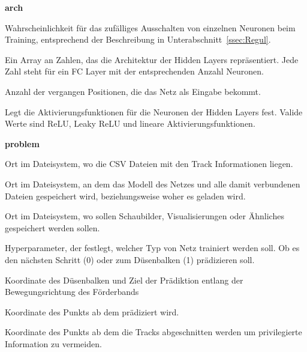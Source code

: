 
\newpage
{\Large \sffamily \textbf{arch}}
\begin{description}[leftmargin=!,labelwidth=\widthof{\bfseries separatorPosition}, labelindent=0.5cm]
    \item [dropoutRate] Wahrscheinlichkeit für das zufälliges Ausschalten von einzelnen Neuronen beim Training, entsprechend der Beschreibung in Unterabschnitt~\ref{ssec:Regul}.
    \item [hiddenLayers] Ein Array an Zahlen, das die Architektur der Hidden Layers repräsentiert. Jede Zahl steht für ein FC Layer mit der entsprechenden Anzahl Neuronen.
    \item [featureSize] Anzahl der vergangen Positionen, die das Netz als Eingabe bekommt.
    \item [activation] Legt die Aktivierungsfunktionen für die Neuronen der Hidden Layers fest. Valide Werte sind ReLU, Leaky ReLU und lineare Aktivierungsfunktionen.
\end{description}

\bigskip
{\Large \sffamily \textbf{problem}}

\begin{description}[leftmargin=!,labelwidth=\widthof{\bfseries separatorPosition}, labelindent=0.5cm]
    \item[dataPath] Ort im Dateisystem, wo die CSV Dateien mit den Track Informationen liegen.
    \item[modelBasePath] Ort im Dateisystem, an dem das Modell des Netzes und alle damit verbundenen Dateien gespeichert wird, beziehungsweise woher es geladen wird. 
    \item [imagePath] Ort im Dateisystem, wo sollen Schaubilder, Visualisierungen oder Ähnliches gespeichert werden sollen.
    \item [separator] Hyperparameter, der festlegt, welcher Typ von Netz trainiert werden soll. Ob es den nächsten Schritt (0) oder zum Düsenbalken (1) prädizieren soll.
\end{description}

\begin{description}[leftmargin=!,labelwidth=\widthof{\bfseries separatorPosition}, labelindent=0.5cm]
    \item[separatorPosition] Koordinate des Düsenbalken und Ziel der Prädiktion entlang der Bewegungsrichtung des Förderbands
    \item[thresholdPoint] Koordinate des Punkts ab dem prädiziert wird.
    \item[predictionCutOff] Koordinate des Punkts ab dem die Tracks abgeschnitten werden um privilegierte Information zu vermeiden.
\end{description}

